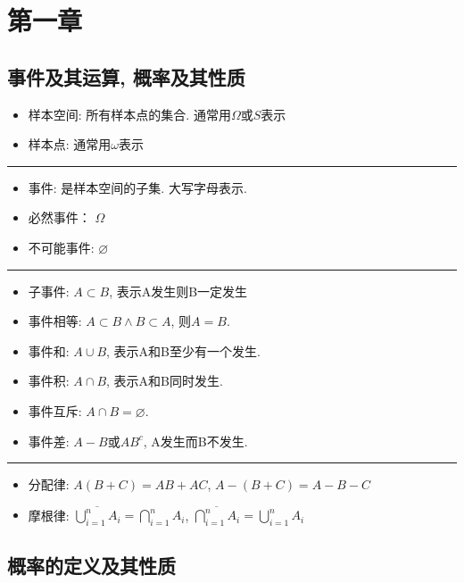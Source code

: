 \documentclass[UTF8]{article}
\newcommand{\itemblt}{\item[$\bullet$]}
\begin{document}
	
\section{第一章}

\subsection{事件及其运算, 概率及其性质}

\begin{itemize}
	\itemblt 样本空间: 所有样本点的集合. 通常用$\Omega$或$S$表示
	\itemblt 样本点: 通常用$\omega$表示
\end{itemize}

\hrule

\begin{itemize}
	\itemblt 事件: 是样本空间的子集. 大写字母表示.
	\itemblt 必然事件： $\Omega$
	\itemblt 不可能事件: $\varnothing$
\end{itemize}

\hrule

\begin{itemize}
	\itemblt 子事件: $A\subset B$, 表示A发生则B一定发生
	\itemblt 事件相等: $A\subset B \land B\subset A$, 则$A=B$.
	\itemblt 事件和: $A\cup B$, 表示A和B至少有一个发生.
	\itemblt 事件积: $A\cap B$, 表示A和B同时发生.
	\itemblt 事件互斥: $A\cap B=\varnothing$.
	\itemblt 事件差: $A-B$或$AB^{c}$, A发生而B不发生.
\end{itemize}

\hrule

\begin{itemize}
	\itemblt 分配律: $A(B+C)=AB+AC$, $A-(B+C)=A-B-C$
	\itemblt 摩根律: $\overline{\bigcup\limits_{i=1}^nA_i}=\bigcap\limits_{i=1}^nA_i$, $\overline{\bigcap\limits_{i=1}^nA_i}=\bigcup\limits_{i=1}^nA_i$
\end{itemize}

\subsection{概率的定义及其性质}
\end{document}
